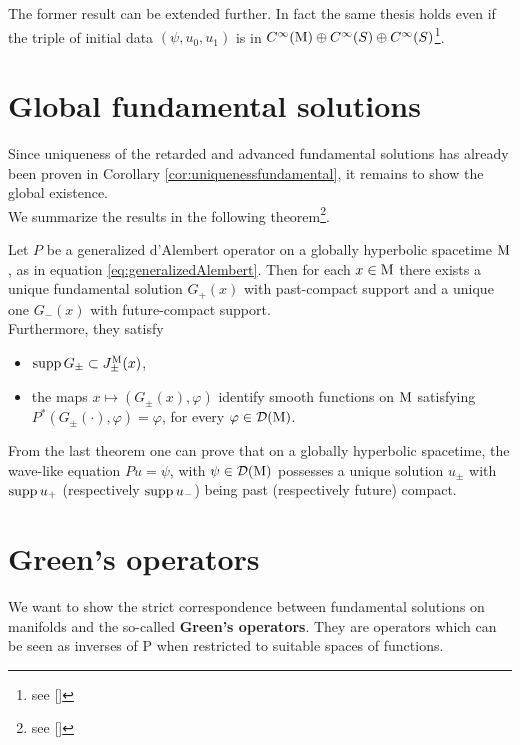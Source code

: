 \begin{rem}
	The former result can be extended further. In fact the same thesis holds even if the triple of initial data $(\psi,u_0,u_1)$ is in $C^\infty(\mathrm{M})\oplus C^\infty(S)\oplus C^\infty(S)$\footnote{see [\citealp[Cor 5]{ginoux}]}.
\end{rem}



\section{Global fundamental solutions}
Since uniqueness of the retarded and advanced fundamental solutions has already been proven in Corollary \ref{cor:uniquenessfundamental}, it remains to show the global existence.\\
We summarize the results in the following theorem\footnote{see [\citealp[Th. 4]{ginoux}]}.
\begin{theorem}
	Let $P$ be a generalized d'Alembert operator on a globally hyperbolic spacetime $\mathrm{M}$, as in equation \eqref{eq:generalizedAlembert}. Then for each $x\in\mathrm{M}$ there exists a unique fundamental solution $G_+(x)$ with past-compact support and a unique one $G_-(x)$ with future-compact support.\\
	Furthermore, they satisfy
	\begin{itemize}
		\item $\text{supp}\, G_\pm\subset J_\pm^{\mathrm{M}}(x)$,
		\item the maps $x\mapsto(G_\pm(x),\varphi)$ identify smooth functions on $\mathrm{M}$ satisfying $P^*(G_\pm(\cdot),\varphi)=\varphi$, for every $\varphi\in\mathcal{D}(\mathrm{M})$.
	\end{itemize}
\end{theorem}

\begin{rem}
	From the last theorem one can prove that on a globally hyperbolic spacetime, the wave-like equation $Pu=\psi$, with $\psi\in\mathcal{D}(\mathrm{M})$ possesses a unique solution $u_\pm$ with $\text{supp}\, u_+$ (respectively $\text{supp}\, u_-$) being past (respectively future) compact.
\end{rem}

\section{Green's operators}

We want to show the strict correspondence between fundamental solutions on manifolds and the so-called \textbf{Green's operators}. They are operators which can be seen as inverses of P when restricted to suitable spaces of functions.\\

